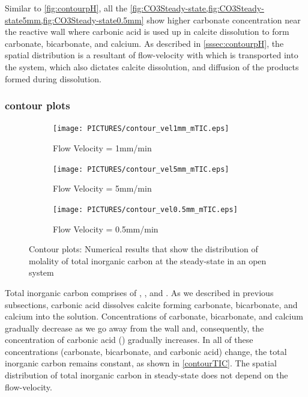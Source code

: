 Similar to \cref{fig:contourpH}, all the \cref{fig:CO3Steady-state,fig:CO3Steady-state5mm,fig:CO3Steady-state0.5mm} show higher 
carbonate concentration near the reactive wall where carbonic acid is used up in calcite dissolution to form carbonate, bicarbonate, and calcium. 
As described in \cref{sssec:contourpH}, the spatial distribution is a resultant of flow-velocity with which  is transported into the system, which 
also dictates calcite dissolution, and diffusion of the products formed during dissolution. 

\subsubsection*{ contour plots} \label{sssec:contourmTIC}
\begin{figure}[!h]
\centering
    \begin{subfigure}{.5\linewidth}
        \centering
        \texttt{[image: PICTURES/contour\_vel1mm\_mTIC.eps]}
        \caption{Flow Velocity = 1mm/min}
        \label{fig:TICSteady-state}       %
    \end{subfigure}%
    \hfill
    \begin{subfigure}{.5\linewidth}
        \centering
        \texttt{[image: PICTURES/contour\_vel5mm\_mTIC.eps]}
        \caption{Flow Velocity = 5mm/min}
        \label{fig:TICSteady-state5mm}       %
    \end{subfigure}%
    \hfill
    \begin{subfigure}{.5\linewidth}
        \centering
        \texttt{[image: PICTURES/contour\_vel0.5mm\_mTIC.eps]}
        \caption{Flow Velocity = 0.5mm/min}
        \label{fig:TICSteady-state0.5mm}       %
    \end{subfigure}%
    \caption{\DuMuX Contour plots: Numerical results that show the distribution of molality of total inorganic carbon at the steady-state in an open system}
     \label{fig:contourTIC}
\end{figure}

Total inorganic carbon comprises of , ,  and . As we described in previous subsections, 
carbonic acid dissolves calcite forming carbonate, bicarbonate, and calcium into the solution. Concentrations of carbonate, bicarbonate, and calcium 
gradually decrease as we go away from the wall and, consequently, the concentration of carbonic acid () gradually increases. 
In all of these concentrations (carbonate, bicarbonate, and carbonic acid) change, the total inorganic carbon remains constant, as shown in \cref{contourTIC}.
The spatial distribution of total inorganic carbon in steady-state does not depend on the flow-velocity. 

